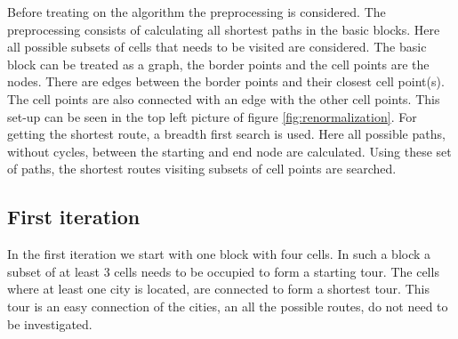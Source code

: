 Before treating on the algorithm the preprocessing is considered.  The preprocessing consists of calculating all shortest paths in the basic blocks. Here all possible subsets of cells that needs to be visited are considered.
\newline\newline\noindent
The basic block can be treated as a graph, the border points and the cell points are the nodes. There are edges between the border points and their closest cell point(s). The cell points are also connected with an edge with the other cell points. This set-up can be seen in the top left picture of figure \ref{fig:renormalization}. For getting the shortest route, a breadth first search is used. Here all possible paths, without cycles, between the starting and end node are calculated. Using these set of paths, the shortest routes visiting subsets of cell points are searched.
\subsection{First iteration}
In the first iteration we start with one block with four cells. In such a block a subset of at least 3 cells needs to be occupied to form a starting tour. The cells where at least one city is located, are connected to form a shortest tour. This tour is an easy connection of the cities, an all the possible routes, do not need to be investigated.
